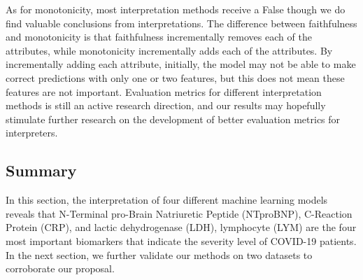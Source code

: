 As for monotonicity, most interpretation methods receive a False though we do find valuable conclusions from interpretations. The difference between faithfulness and monotonicity is that faithfulness incrementally removes each of the attributes, while monotonicity incrementally adds each of the attributes. By incrementally adding each attribute, initially, the model may not be able to make correct predictions with only one or two features, but this does not mean these features are not important. Evaluation metrics for different interpretation methods is still an active research direction, and our results may hopefully stimulate further research on the development of better evaluation metrics for interpreters.


\color{black}

\subsection{\textbf{Summary}}

In this section, the interpretation of four different machine learning models reveals that N-Terminal pro-Brain Natriuretic Peptide (NTproBNP), C-Reaction Protein (CRP), and lactic dehydrogenase (LDH), lymphocyte (LYM) are the four most important biomarkers that indicate the severity level of COVID-19 patients. In the next section, we further validate our methods on two datasets to corroborate our proposal.


